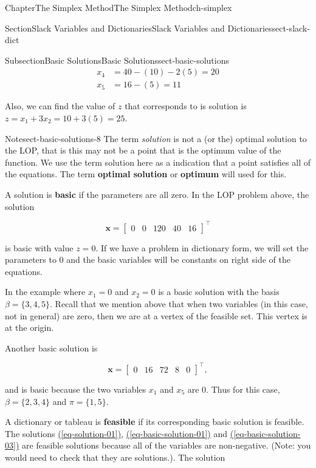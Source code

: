 \documentclass[oneside,10pt,]{book}
\newcommand{\xreffont}{\relax}
\newcommand{\terminology}[1]{\textbf{#1}}
\numberwithin{equation}{section}
\newcommand{\amp}{&}
\begin{document}
\begin{chapterptx}{Chapter}{The Simplex Method}{}{The Simplex Method}{}{}{ch-simplex}
\begin{sectionptx}{Section}{Slack Variables and Dictionaries}{}{Slack Variables and Dictionaries}{}{}{sect-slack-dict}
\begin{subsectionptx}{Subsection}{Basic Solutions}{}{Basic Solutions}{}{}{sect-basic-solutions}
\begin{align*}
x_4 \amp = 40 - (10) - 2(5) = 20\\
x_5 \amp = 16 - (5) = 11
\end{align*}
%
\par
Also, we can find the value of \(z\) that corresponds to is solution is \(z=x_1+3x_2 = 10 + 3(5) = 25\).%
\begin{note}{Note}{}{sect-basic-solutions-8}%
The term \emph{solution} is not a (or the) optimal solution to the LOP, that is this may not be a point that is the optimum value of the function. We use the term solution here as a indication that a point satisfies all of the equations. The term \terminology{optimal solution} or \terminology{optimum} will used for this.%
\end{note}
A solution is \terminology{basic} if the parameters are all zero. In the LOP problem above, the solution%
\par
%
\begin{equation}
\boldsymbol{x}=\left[\begin{array}{rr|rrr}0 \amp 0 \amp 120 \amp 40 \amp 16\end{array}\right]^{\intercal}\label{eq-basic-solution-01}
\end{equation}
%
\par
is basic with value \(z=0\). If we have a problem in dictionary form, we will set the parameters to 0 and the basic variables will be constants on right side of the equations.%
\par
In the example where \(x_1 =0\) and \(x_2=0\) is a basic solution with the basis \(\beta = \{3, 4, 5\}\). Recall that we mention above that when two variables (in this case, not in general) are zero, then we are at a vertex of the feasible set. This vertex is at the origin.%
\par
Another basic solution is%
\par
%
\begin{equation}
\boldsymbol{x}=\left[\begin{array}{rr|rrr} 0 \amp 16 \amp  72 \amp 8 \amp 0\end{array}\right]^{\intercal},\label{eq-basic-solution-03}
\end{equation}
%
\par
and is basic because the two variables \(x_1\) and \(x_5\) are 0. Thus for this case, \(\beta=\{2,3,4\}\) and \(\pi=\{1,5\}.\)%
\par
A dictionary or tableau is \terminology{feasible} if its corresponding basic solution is feasible. The solutions  \hyperref[eq-solution-01]{({\xreffont\ref{eq-solution-01}})},  \hyperref[eq-basic-solution-01]{({\xreffont\ref{eq-basic-solution-01}})} and \hyperref[eq-basic-solution-03]{({\xreffont\ref{eq-basic-solution-03}})} are feasible solutions because all of the variables are non-negative. (Note: you would need to check that they are solutions.). The solution%

\end{subsectionptx}
\end{sectionptx}
\end{chapterptx}
\end{document}
